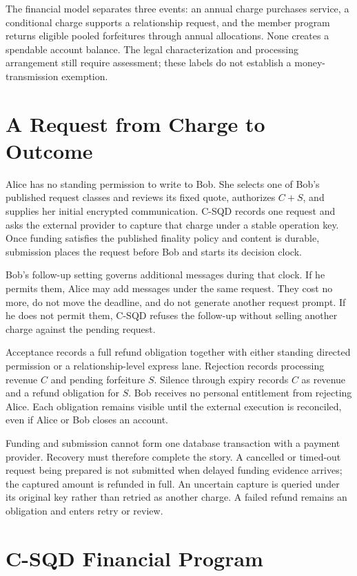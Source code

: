 \documentclass[11pt]{article}
\begin{document}
The financial model separates three events: an annual charge purchases service,
a conditional charge supports a relationship request, and the member program
returns eligible pooled forfeitures through annual allocations. None creates a
spendable account balance. The legal characterization and processing arrangement
still require assessment; these labels do not establish a money-transmission
exemption.

\section{A Request from Charge to Outcome}

Alice has no standing permission to write to Bob. She selects one of Bob's
published request classes and reviews its fixed quote,
authorizes $C+S$, and supplies her initial encrypted communication. C-SQD records
one request and asks the external provider to capture that charge under a stable
operation key. Once funding satisfies the published finality policy and content is durable,
submission places the request before Bob and starts its decision clock.

Bob's follow-up setting governs additional messages during that clock. If he
permits them, Alice may add messages under the same request. They cost no more,
do not move the deadline, and do not generate another request prompt. If he does
not permit them, C-SQD refuses the follow-up without selling another charge
against the pending request.

Acceptance records a full refund obligation together with either standing
directed permission or a relationship-level express lane. Rejection
records processing revenue $C$ and pending forfeiture $S$. Silence through expiry
records $C$ as revenue and a refund obligation for $S$. Bob receives no personal
entitlement from rejecting Alice. Each obligation remains visible until the
external execution is reconciled, even if Alice or Bob closes an account.

Funding and submission cannot form one database transaction with a payment
provider. Recovery must therefore complete the story. A cancelled or timed-out
request being prepared is not submitted when delayed funding evidence arrives;
the captured amount is refunded in full. An uncertain capture is queried under
its original key rather than retried as another charge. A failed refund remains
an obligation and enters retry or review.

\section{C-SQD Financial Program}\label{sec:program}
\end{document}
